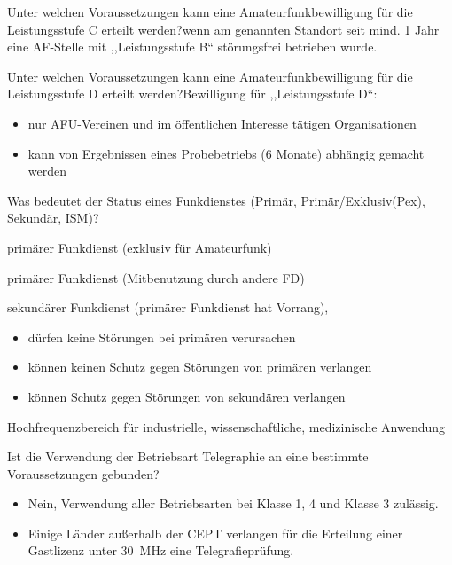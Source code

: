 \documentclass[avery5371,grid,frame,a4paper]{flashcards}
\newcommand{\card}[3]{
  \begin{flashcard}[{\chap} -- #1]{#2}#3\end{flashcard}
}
\begin{document}
\card{43}{Unter welchen Voraussetzungen kann eine Amateurfunkbewilligung für die Leistungsstufe C erteilt werden?}{wenn am genannten Standort seit mind. 1 Jahr eine AF-Stelle mit ,,Leistungsstufe B`` störungsfrei betrieben wurde.}

\card{44}{Unter welchen Voraussetzungen kann eine Amateurfunkbewilligung für die Leistungsstufe D erteilt werden?}{Bewilligung für ,,Leistungsstufe D``: \begin{itemize}\itemsep1pt \item nur AFU-Vereinen und im öffentlichen Interesse tätigen Organisationen \item kann von Ergebnissen eines Probebetriebs (6 Monate) abhängig gemacht werden\end{itemize}}

\card{45}{Was bedeutet der Status eines Funkdienstes (Primär, Primär/Exklusiv(Pex), Sekundär, ISM)?}{
 \footnotesize
  \begin{description}\itemsep0pt
    \item[Pex] primärer Funkdienst (exklusiv für Amateurfunk)
    \item[P] primärer Funkdienst (Mitbenutzung durch andere FD)
    \item[S] sekundärer Funkdienst (primärer Funkdienst hat Vorrang),
      \begin{itemize}[leftmargin=0pt,itemsep=0pt]
        \item dürfen keine Störungen bei primären verursachen
        \item können keinen Schutz gegen Störungen von primären verlangen
        \item können Schutz gegen Störungen von sekundären verlangen
      \end{itemize}
    \item[ISM] Hochfrequenzbereich für industrielle, wissenschaftliche, medizinische Anwendung
  \end{description}
}

\card{46}{Ist die Verwendung der Betriebsart Telegraphie an eine bestimmte Voraussetzungen gebunden?}{\begin{itemize}\itemsep1pt \item Nein, Verwendung aller Betriebsarten bei Klasse 1, 4 und Klasse 3 zulässig. \item Einige Länder außerhalb der CEPT verlangen für die Erteilung einer Gastlizenz
unter 30~MHz eine Telegrafieprüfung.\end{itemize}}
\end{document}
